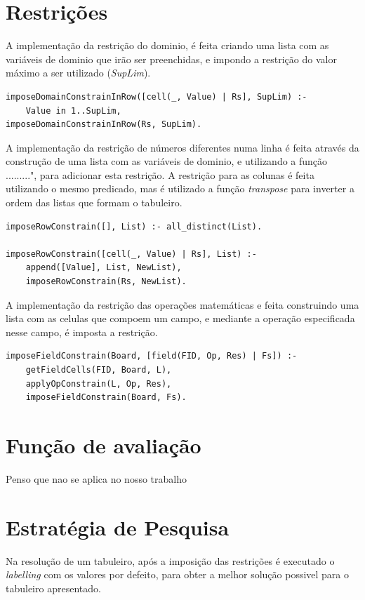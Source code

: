 \documentclass[runningheads,a4paper]{llncs}
\begin{document}
\section{Restrições}
A implementação da restrição do dominio, é feita criando uma lista com as variáveis de dominio que irão ser preenchidas, e impondo a restrição do valor máximo a ser utilizado (\emph{SupLim}).
\noindent
\begin{verbatim}
imposeDomainConstrainInRow([cell(_, Value) | Rs], SupLim) :- 
	Value in 1..SupLim,										 					 				imposeDomainConstrainInRow(Rs, SupLim).
\end{verbatim}

A implementação da restrição de números diferentes numa linha é feita através da construção de uma lista com as variáveis de dominio, e utilizando a função .........", para adicionar esta restrição.
A restrição para as colunas é feita utilizando o mesmo predicado, mas é utilizado a função \emph{transpose} para inverter a ordem das listas que formam o tabuleiro.
\begin{verbatim}
imposeRowConstrain([], List) :- all_distinct(List).

imposeRowConstrain([cell(_, Value) | Rs], List) :- 
	append([Value], List, NewList),
	imposeRowConstrain(Rs, NewList).
\end{verbatim}

A implementação da restrição das operações matemáticas e feita construindo uma lista com as celulas que compoem um campo, e mediante a operação especificada nesse campo, é imposta a restrição.
\begin{verbatim}
imposeFieldConstrain(Board, [field(FID, Op, Res) | Fs]) :- 
	getFieldCells(FID, Board, L),
	applyOpConstrain(L, Op, Res),
	imposeFieldConstrain(Board, Fs).
\end{verbatim}

\section{Função de avaliação}
Penso que nao se aplica no nosso trabalho

\section{Estratégia de Pesquisa}
Na resolução de um tabuleiro, após a imposição das restrições é executado o \emph{labelling} com os valores por defeito, para obter a melhor solução possivel para o tabuleiro apresentado.
\end{document}
